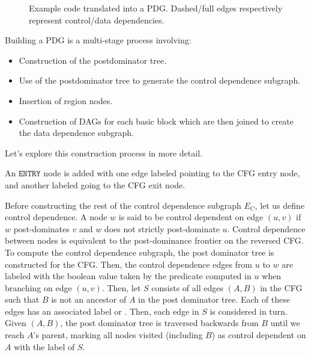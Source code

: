 \begin{figure}
\centering
{}

\subfloat[PDG]{
  \useheightbox{}
}
\caption{Example code translated into a PDG. Dashed/full edges respectively represent control/data dependencies.}
\label{fig:pdg}
\end{figure}

Building a PDG is a multi-stage process involving:

\begin{itemize}
\item Construction of the postdominator tree.
\item Use of the postdominator tree to generate the control dependence subgraph.
\item Insertion of region nodes.
\item Construction of DAGs for each basic block which are then joined to create the data dependence subgraph.
\end{itemize}

Let's explore this construction process in more detail.

An $\texttt{ENTRY}$ node is added with one edge labeled \true pointing to the CFG entry node, and another labeled \false going to the CFG exit node. 

Before constructing the rest of the control dependence subgraph $E_C$, let us define control dependence. A node $w$ is said to be control dependent on edge $(u,v)$ if $w$ post-dominates $v$ and $w$ does not strictly post-dominate $u$.
Control dependence between nodes is equivalent to the post-dominance frontier on the reversed CFG. To compute the control dependence subgraph, the post dominator tree is constructed for the CFG. 
Then, the control dependence edges from $u$ to $w$ are labeled with the boolean value taken by the predicate computed in $u$ when branching on edge $(u,v)$. 
Then, let $S$ consists of all edges $(A,B)$ in the CFG such that $B$ is not an ancestor of $A$ in the post dominator tree. 
Each of these edges has an associated label \true or \false. 
Then, each edge in $S$ is considered in turn. 
Given $(A,B)$, the post dominator tree is traversed backwards from $B$ until we reach $A$'s parent, marking all nodes visited (including $B$) as control dependent on $A$ with the label of $S$.

